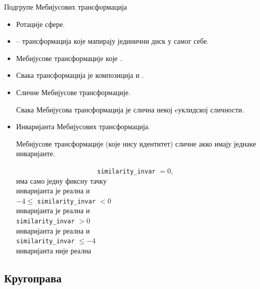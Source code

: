 \documentclass[slidestop, compress, mathserif, containsverbatim, xcolor=dvipsnames]{beamer}
\begin{document}
\begin{frame}{Подгрупе Мебијусових трансформација}
  \begin{itemize}
  \item Ротације сфере. \vfill
  \item {} -- трансформација које мапирају
    јединични диск у самог себе. \vfill
  \item Мебијусове трансформације које . \vfill
  \item Свака трансформација је композиција 
    и . \vfill
  \end{itemize}
\end{frame}

\begin{frame}[shrink]{}
  \begin{itemize}
  \item Сличне Мебијусове трансформације. 
    \begin{block}{}
      Свака Мебијусова трансформација је слична некој eуклидској
      сличности.
    \end{block}
  \item Инваријанта Мебијусових трансформација.
  \begin{block}{}
    Мебијусове трансформације (које нису идентитет) сличне акко имају
    једнаке инваријанте.
  \end{block}
  \begin{tabbing}
    ~~~~~~~~~~~~~~~~~~~~~~ \= {\tt similarity\_invar} $= 0$, \\
    \> има само једну фиксну тачку \\
      \> инваријанта је реална и \\
    \> $-4 \le $ {\tt similarity\_invar} $< 0$ \\
      \> инваријанта је реална и \\
    \> {\tt similarity\_invar} $ > 0$ \\
      \> инваријанта је реална и \\
    \> {\tt similarity\_invar} $\le -4$ \\
     \> инваријанта није реална
  \end{tabbing}
  \end{itemize}
\end{frame}

\subsection*{Кругоправа}
\end{document}
